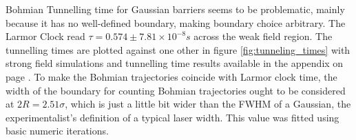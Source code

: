 Bohmian Tunnelling time for Gaussian barriers seems to be problematic, mainly because it has no well-defined boundary, making boundary choice arbitrary. The Larmor Clock read $\tau = 0.574 \pm 7.81\times10^{-8} s$ across the weak field region. The tunnelling times are plotted against one other in figure \ref{fig:tunneling_times} with strong field simulations and tunnelling time results available in the appendix on page . To make the Bohmian trajectories coincide with Larmor clock time, the width of the boundary for counting Bohmian trajectories ought to be considered at $2R=2.51 \sigma$, which is just a little bit wider than the FWHM of a Gaussian, the experimentalist's definition of a typical laser width. This value was fitted using basic numeric iterations.